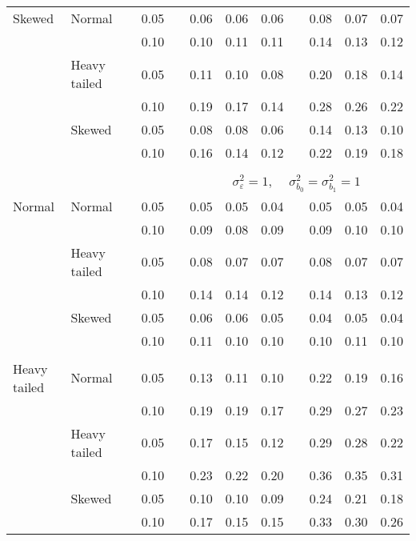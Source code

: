 \begin{table}[ht]
\begin{scriptsize}
\begin{center}
\begin{tabular}{ll p{.1cm} c p{.1cm} rrr p{.1cm} rrr}
Skewed       & Normal       && 0.05 &&  0.06 & 0.06 & 0.06 && 0.08 & 0.07 & 0.07 \\ 
             &              && 0.10 &&  0.10 & 0.11 & 0.11 && 0.14 & 0.13 & 0.12 \\ 
             & Heavy tailed && 0.05 &&  0.11 & 0.10 & 0.08 && 0.20 & 0.18 & 0.14 \\ 
             &              && 0.10 &&  0.19 & 0.17 & 0.14 && 0.28 & 0.26 & 0.22 \\ 
             & Skewed       && 0.05 &&  0.08 & 0.08 & 0.06 && 0.14 & 0.13 & 0.10 \\ 
             &              && 0.10 &&  0.16 & 0.14 & 0.12 && 0.22 & 0.19 & 0.18 \\ 

&&&&&&&&&&&\\
& && && \multicolumn{7}{c}{$\sigma_{\varepsilon}^2 = 1$, \ \ $\sigma_{b_0}^2 = \sigma_{b_1}^2 = 1$} \\ \cline{6-12}
\rowcolor{gray!20}Normal       & Normal       && 0.05 &&  0.05 & 0.05 & 0.04 && 0.05 & 0.05 & 0.04 \\ 
\rowcolor{gray!20}             &              && 0.10 &&  0.09 & 0.08 & 0.09 && 0.09 & 0.10 & 0.10 \\ 
\rowcolor{gray!20}             & Heavy tailed && 0.05 &&  0.08 & 0.07 & 0.07 && 0.08 & 0.07 & 0.07 \\ 
\rowcolor{gray!20}             &              && 0.10 &&  0.14 & 0.14 & 0.12 && 0.14 & 0.13 & 0.12 \\ 
\rowcolor{gray!20}             & Skewed       && 0.05 &&  0.06 & 0.06 & 0.05 && 0.04 & 0.05 & 0.04 \\ 
\rowcolor{gray!20}             &              && 0.10 &&  0.11 & 0.10 & 0.10 && 0.10 & 0.11 & 0.10 \\ 
             &&&&&&&&&&&\\
Heavy tailed & Normal       && 0.05 &&  0.13 & 0.11 & 0.10 && 0.22 & 0.19 & 0.16 \\ 
             &              && 0.10 &&  0.19 & 0.19 & 0.17 && 0.29 & 0.27 & 0.23 \\ 
             & Heavy tailed && 0.05 &&  0.17 & 0.15 & 0.12 && 0.29 & 0.28 & 0.22 \\ 
             &              && 0.10 &&  0.23 & 0.22 & 0.20 && 0.36 & 0.35 & 0.31 \\ 
             & Skewed       && 0.05 &&  0.10 & 0.10 & 0.09 && 0.24 & 0.21 & 0.18 \\ 
             &              && 0.10 &&  0.17 & 0.15 & 0.15 && 0.33 & 0.30 & 0.26 \\ 

\end{tabular}
\end{center}
\end{scriptsize}
\end{table}
